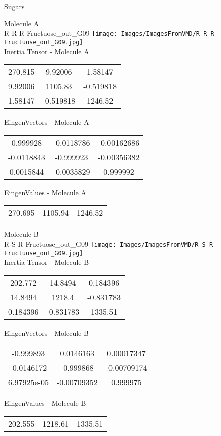 \vtab[-2cm]
\begin{center}
{\large Sugars}
\end{center}
\begin{multicols}{2}
\begin{center}
Molecule A \\ 
R-R-R-Fructuose\_out\_G09
\texttt{[image: Images/ImagesFromVMD/R-R-R-Fructuose\_out\_G09.jpg]}
\\
Inertia Tensor - Molecule A \\
\vtab
\begin{tabular}{|c c c|}
270.815	 & 	9.92006	 & 	1.58147	 \\
9.92006	 & 	1105.83	 & 	-0.519818	 \\
1.58147	 & 	-0.519818	 & 	1246.52
\end{tabular}

\vtab
 EingenVectors - Molecule A     \\
\vtab
\begin{tabular}{|c c c|}
0.999928	 & 	-0.0118786	 & 	-0.00162686	 \\
-0.0118843	 & 	-0.999923	 & 	-0.00356382	 \\
0.0015844	 & 	-0.0035829	 & 	0.999992
\end{tabular}

\vtab
 EingenValues - Molecule A     \\
\vtab
\begin{tabular}{|c c c|}
270.695	 & 	1105.94	 & 	1246.52
\end{tabular}
\columnbreak

Molecule B \\ 
R-S-R-Fructuose\_out\_G09
\texttt{[image: Images/ImagesFromVMD/R-S-R-Fructuose\_out\_G09.jpg]}
\\
Inertia Tensor - Molecule B \\
\vtab
\begin{tabular}{|c c c|}
202.772	 & 	14.8494	 & 	0.184396	 \\
14.8494	 & 	1218.4	 & 	-0.831783	 \\
0.184396	 & 	-0.831783	 & 	1335.51
\end{tabular}

\vtab
 EingenVectors - Molecule B     \\
\vtab
\begin{tabular}{|c c c|}
-0.999893	 & 	0.0146163	 & 	0.00017347	 \\
-0.0146172	 & 	-0.999868	 & 	-0.00709174	 \\
6.97925e-05	 & 	-0.00709352	 & 	0.999975
\end{tabular}

\vtab
 EingenValues - Molecule B     \\
\vtab
\begin{tabular}{|c c c|}
202.555	 & 	1218.61	 & 	1335.51
\end{tabular}

\end{center}
\end{multicols}
